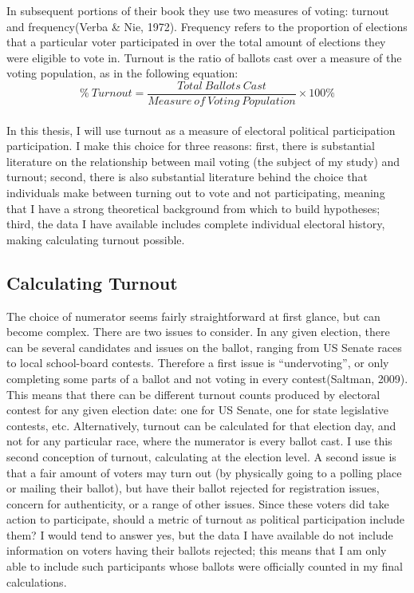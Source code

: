 \documentclass[12pt,twoside]{reedthesis}
\begin{document}
  In subsequent portions of their book they use two measures of voting:
  turnout and frequency(Verba \& Nie, 1972). Frequency refers to the
  proportion of elections that a particular voter participated in over the
  total amount of elections they were eligible to vote in. Turnout is the
  ratio of ballots cast over a measure of the voting population, as in the
  following equation:\\
  \[ \% ~Turnout = \frac{Total~Ballots~Cast}{Measure~of~Voting~Population}\times100\%\]\\
  In this thesis, I will use turnout as a measure of electoral political
  participation participation. I make this choice for three reasons:
  first, there is substantial literature on the relationship between mail
  voting (the subject of my study) and turnout; second, there is also
  substantial literature behind the choice that individuals make between
  turning out to vote and not participating, meaning that I have a strong
  theoretical background from which to build hypotheses; third, the data I
  have available includes complete individual electoral history, making
  calculating turnout possible.
  
  \subsection{Calculating Turnout}\label{calculating-turnout}
  
  The choice of numerator seems fairly straightforward at first glance,
  but can become complex. There are two issues to consider. In any given
  election, there can be several candidates and issues on the ballot,
  ranging from US Senate races to local school-board contests. Therefore a
  first issue is ``undervoting'', or only completing some parts of a
  ballot and not voting in every contest(Saltman, 2009). This means that
  there can be different turnout counts produced by electoral contest for
  any given election date: one for US Senate, one for state legislative
  contests, etc. Alternatively, turnout can be calculated for that
  election day, and not for any particular race, where the numerator is
  every ballot cast. I use this second conception of turnout, calculating
  at the election level. A second issue is that a fair amount of voters
  may turn out (by physically going to a polling place or mailing their
  ballot), but have their ballot rejected for registration issues, concern
  for authenticity, or a range of other issues. Since these voters did
  take action to participate, should a metric of turnout as political
  participation include them? I would tend to answer yes, but the data I
  have available do not include information on voters having their ballots
  rejected; this means that I am only able to include such participants
  whose ballots were officially counted in my final calculations.
  
\end{document}
